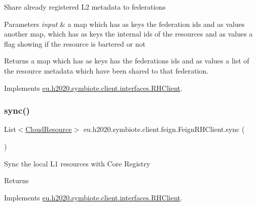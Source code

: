 Share already registered L2 metadata to federations


\begin{DoxyParams}{Parameters}
{\em input} & a map which has as keys the federation ids and as values another map, which has as keys the internal ids of the resources and as values a flag showing if the resource is bartered or not \\
\hline
\end{DoxyParams}
\begin{DoxyReturn}{Returns}
a map which has as keys has the federations ids and as values a list of the resource metadata which have been shared to that federation. 
\end{DoxyReturn}


Implements \hyperlink{interfaceeu_1_1h2020_1_1symbiote_1_1client_1_1interfaces_1_1RHClient_ab033d6b4967030ca4d63f8186b147a88}{eu.\+h2020.\+symbiote.\+client.\+interfaces.\+R\+H\+Client}.

\mbox{\label{classeu_1_1h2020_1_1symbiote_1_1client_1_1feign_1_1FeignRHClient_a8181d6656e2c7dea2d01bc5ee16e8639}} 
\subsubsection{\texorpdfstring{sync()}{sync()}}
{\footnotesize\ttfamily List$<$\hyperlink{classeu_1_1h2020_1_1symbiote_1_1cloud_1_1model_1_1internal_1_1CloudResource}{Cloud\+Resource}$>$ eu.\+h2020.\+symbiote.\+client.\+feign.\+Feign\+R\+H\+Client.\+sync (\begin{DoxyParamCaption}{ }\end{DoxyParamCaption})}

Sync the local L1 resources with Core Registry

\begin{DoxyReturn}{Returns}

\end{DoxyReturn}


Implements \hyperlink{interfaceeu_1_1h2020_1_1symbiote_1_1client_1_1interfaces_1_1RHClient_ae450ac97070e6968eb9d1bfcfd3ae3e6}{eu.\+h2020.\+symbiote.\+client.\+interfaces.\+R\+H\+Client}.

